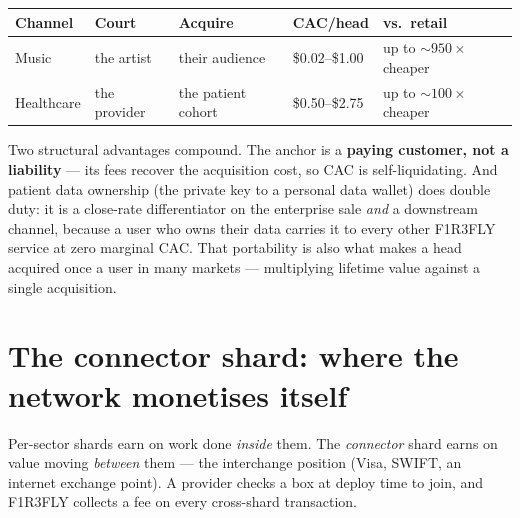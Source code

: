 \documentclass[11pt]{article}
\begin{document}
\begin{center}
\renewcommand{\arraystretch}{1.25}
\begin{tabular}{@{}lllll@{}}
\toprule
\rowcolor{headrow}
\textbf{Channel} & \textbf{Court} & \textbf{Acquire} & \textbf{CAC/head} & \textbf{vs.\ retail} \\
\midrule
Music     & the artist   & their audience & \$0.02--\$1.00 & up to ${\sim}950\times$ cheaper \\
Healthcare & the provider & the patient cohort & \$0.50--\$2.75 & up to ${\sim}100\times$ cheaper \\
\bottomrule
\end{tabular}
\end{center}

Two structural advantages compound. The anchor is a \textbf{paying customer, not a liability} --- its fees recover the acquisition cost, so CAC is self-liquidating. And patient data ownership (the private key to a personal data wallet) does double duty: it is a close-rate differentiator on the enterprise sale \emph{and} a downstream channel, because a user who owns their data carries it to every other F1R3FLY service at zero marginal CAC. That portability is also what makes a head acquired once a user in many markets --- multiplying lifetime value against a single acquisition.

\section{The connector shard: where the network monetises itself}

Per-sector shards earn on work done \emph{inside} them. The \emph{connector} shard earns on value moving \emph{between} them --- the interchange position (Visa, SWIFT, an internet exchange point). A provider checks a box at deploy time to join, and F1R3FLY collects a fee on every cross-shard transaction.

\begin{center}
\end{center}
\end{document}
